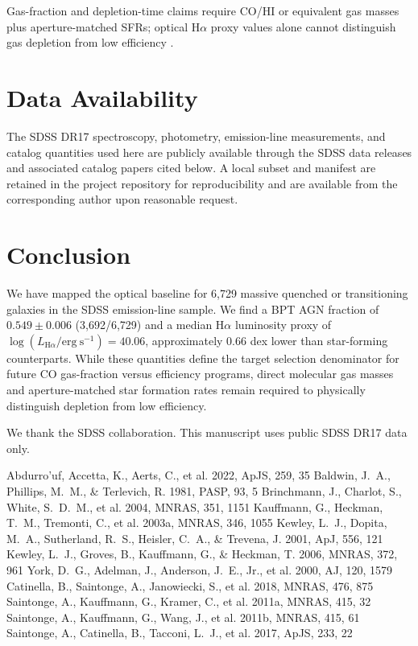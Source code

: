 \documentclass[twocolumn]{aastex631}
\begin{document}
Gas-fraction and depletion-time claims require CO/HI or equivalent gas masses plus aperture-matched SFRs; optical H$\alpha$ proxy values alone cannot distinguish gas depletion from low efficiency \citep{coldgass1,coldgass2,xcoldgass2017,xgass2018}.


\section{Data Availability}\label{sec:data-avail}
The SDSS DR17 spectroscopy, photometry, emission-line measurements, and catalog quantities used here are publicly available through the SDSS data releases and associated catalog papers cited below. A local subset and manifest are retained in the project repository for reproducibility and are available from the corresponding author upon reasonable request.

\section{Conclusion}\label{sec:conclusion}
We have mapped the optical baseline for 6,729 massive quenched or transitioning galaxies in the SDSS emission-line sample. We find a BPT AGN fraction of $0.549 \pm 0.006$ (3,692/6,729) and a median H$\alpha$ luminosity proxy of $\log(L_{\mathrm{H}\alpha} / \mathrm{erg~s}^{-1}) = 40.06$, approximately 0.66 dex lower than star-forming counterparts. While these quantities define the target selection denominator for future CO gas-fraction versus efficiency programs, direct molecular gas masses and aperture-matched star formation rates remain required to physically distinguish depletion from low efficiency.

\acknowledgments
We thank the SDSS collaboration. This manuscript uses public SDSS DR17 data only.


\begin{thebibliography}{}
 Abdurro'uf, Accetta, K., Aerts, C., et al. 2022, ApJS, 259, 35
 Baldwin, J.~A., Phillips, M.~M., \& Terlevich, R. 1981, PASP, 93, 5
 Brinchmann, J., Charlot, S., White, S.~D.~M., et al. 2004, MNRAS, 351, 1151
 Kauffmann, G., Heckman, T.~M., Tremonti, C., et al. 2003a, MNRAS, 346, 1055
 Kewley, L.~J., Dopita, M.~A., Sutherland, R.~S., Heisler, C.~A., \& Trevena, J. 2001, ApJ, 556, 121
 Kewley, L.~J., Groves, B., Kauffmann, G., \& Heckman, T. 2006, MNRAS, 372, 961
 York, D.~G., Adelman, J., Anderson, J.~E., Jr., et al. 2000, AJ, 120, 1579
 Catinella, B., Saintonge, A., Janowiecki, S., et al. 2018, MNRAS, 476, 875
 Saintonge, A., Kauffmann, G., Kramer, C., et al. 2011a, MNRAS, 415, 32
 Saintonge, A., Kauffmann, G., Wang, J., et al. 2011b, MNRAS, 415, 61
 Saintonge, A., Catinella, B., Tacconi, L.~J., et al. 2017, ApJS, 233, 22
\end{thebibliography}
\end{document}
